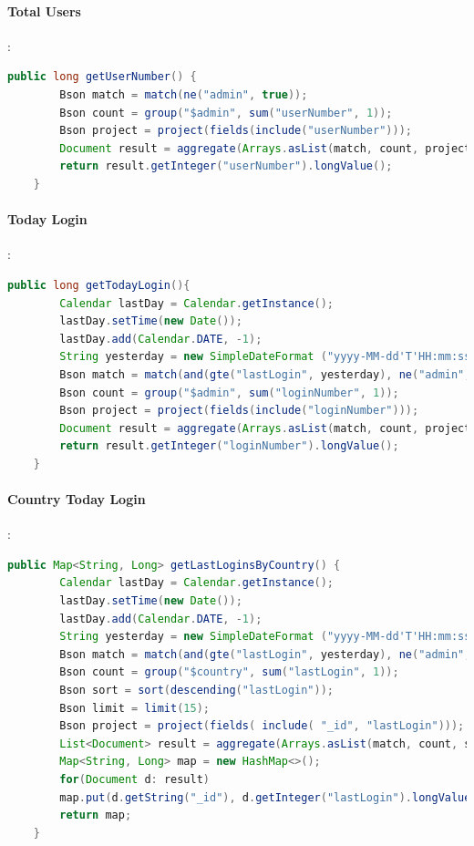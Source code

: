 \paragraph{Total Users}:
\begin{lstlisting}[language=Java]
	public long getUserNumber() {
		Bson match = match(ne("admin", true));
		Bson count = group("$admin", sum("userNumber", 1));
		Bson project = project(fields(include("userNumber")));
		Document result = aggregate(Arrays.asList(match, count, project)).get(0);
		return result.getInteger("userNumber").longValue();
	}
\end{lstlisting}
\paragraph{Today Login}:

\begin{lstlisting}[language=Java]
	public long getTodayLogin(){
		Calendar lastDay = Calendar.getInstance();
		lastDay.setTime(new Date());
		lastDay.add(Calendar.DATE, -1);
		String yesterday = new SimpleDateFormat ("yyyy-MM-dd'T'HH:mm:ss.SSS'Z'", Locale.US).format(lastDay.getTime());
		Bson match = match(and(gte("lastLogin", yesterday), ne("admin", true)));
		Bson count = group("$admin", sum("loginNumber", 1));
		Bson project = project(fields(include("loginNumber")));
		Document result = aggregate(Arrays.asList(match, count, project)).get(0);
		return result.getInteger("loginNumber").longValue();
	}
\end{lstlisting}

\paragraph{Country Today Login}:
\begin{lstlisting}[language=Java]
	public Map<String, Long> getLastLoginsByCountry() {
		Calendar lastDay = Calendar.getInstance();
		lastDay.setTime(new Date());
		lastDay.add(Calendar.DATE, -1);
		String yesterday = new SimpleDateFormat ("yyyy-MM-dd'T'HH:mm:ss.SSS'Z'", Locale.US).format(lastDay.getTime());
		Bson match = match(and(gte("lastLogin", yesterday), ne("admin", true)));
		Bson count = group("$country", sum("lastLogin", 1));
		Bson sort = sort(descending("lastLogin"));
		Bson limit = limit(15);
		Bson project = project(fields( include( "_id", "lastLogin")));
		List<Document> result = aggregate(Arrays.asList(match, count, sort, limit, project));
		Map<String, Long> map = new HashMap<>();
		for(Document d: result)
		map.put(d.getString("_id"), d.getInteger("lastLogin").longValue());
		return map;
	}
\end{lstlisting}



